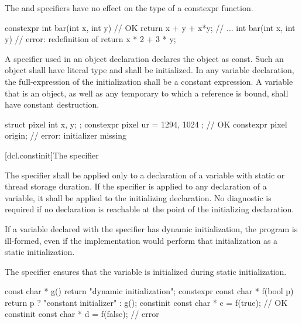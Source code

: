 \pnum
The  and  specifiers have no
effect on the type of a constexpr function.
\begin{example}
\begin{codeblock}
constexpr int bar(int x, int y)         // OK
    { return x + y + x*y; }
// ...
int bar(int x, int y)                   // error: redefinition of 
    { return x * 2 + 3 * y; }
\end{codeblock}
\end{example}

\pnum
A  specifier used in an object declaration
declares the object as const.
Such an object
shall have literal type and
shall be initialized.
In any  variable declaration,
the full-expression of the initialization
shall be a constant expression.
A  variable that is an object,
as well as any temporary to which a  reference is bound,
shall have constant destruction.
\begin{example}
\begin{codeblock}
struct pixel {
  int x, y;
};
constexpr pixel ur = { 1294, 1024 };    // OK
constexpr pixel origin;                 // error: initializer missing
\end{codeblock}
\end{example}

[dcl.constinit]{The  specifier}

\pnum
The  specifier shall be applied only
to a declaration of a variable with static or thread storage duration.
If the specifier is applied to any declaration of a variable,
it shall be applied to the initializing declaration.
No diagnostic is required if no  declaration
is reachable at the point of the initializing declaration.

\pnum
If a variable declared with the  specifier has
dynamic initialization, the program is ill-formed,
even if the implementation would perform that initialization as
a static initialization.
\begin{note}
The  specifier ensures that the variable
is initialized during static initialization.
\end{note}

\pnum
\begin{example}
\begin{codeblock}
const char * g() { return "dynamic initialization"; }
constexpr const char * f(bool p) { return p ? "constant initializer" : g(); }
constinit const char * c = f(true);     // OK
constinit const char * d = f(false);    // error
\end{codeblock}
\end{example}

